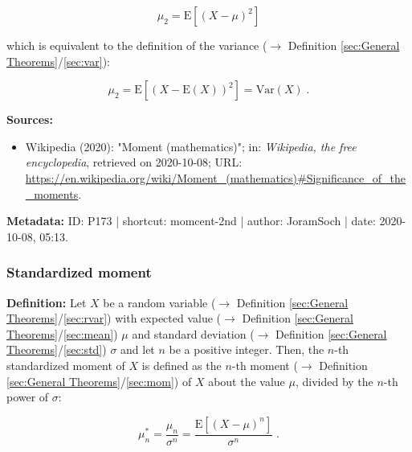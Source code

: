 \documentclass[a4paper,12pt,twoside]{book}
\begin{document}
\begin{equation} \label{eq:momcent-2nd-momcent-2nd-def}
\mu_2 = \mathrm{E}\left[ (X-\mu)^2 \right]
\end{equation}

which is equivalent to the definition of the variance ($\rightarrow$ Definition \ref{sec:General Theorems}/\ref{sec:var}):

\begin{equation} \label{eq:momcent-2nd-momraw-1st-qed}
\mu_2 = \mathrm{E}\left[ (X - \mathrm{E}(X))^2 \right] = \mathrm{Var}(X) \; .
\end{equation}


\vspace{1em}
\textbf{Sources:}
\begin{itemize}
\item Wikipedia (2020): "Moment (mathematics)"; in: \textit{Wikipedia, the free encyclopedia}, retrieved on 2020-10-08; URL: \url{https://en.wikipedia.org/wiki/Moment_(mathematics)#Significance_of_the_moments}.
\end{itemize}


\vspace{1em}
\textbf{Metadata:} ID: P173 | shortcut: momcent-2nd | author: JoramSoch | date: 2020-10-08, 05:13.
\vspace{1em}



\subsubsection[\textit{Standardized moment}]{Standardized moment} \label{sec:mom-stand}
\setcounter{equation}{0}

\textbf{Definition:} Let $X$ be a random variable ($\rightarrow$ Definition \ref{sec:General Theorems}/\ref{sec:rvar}) with expected value ($\rightarrow$ Definition \ref{sec:General Theorems}/\ref{sec:mean}) $\mu$ and standard deviation ($\rightarrow$ Definition \ref{sec:General Theorems}/\ref{sec:std}) $\sigma$ and let $n$ be a positive integer. Then, the $n$-th standardized moment of $X$ is defined as the $n$-th moment ($\rightarrow$ Definition \ref{sec:General Theorems}/\ref{sec:mom}) of $X$ about the value $\mu$, divided by the $n$-th power of $\sigma$:

\begin{equation} \label{eq:mom-stand-mom-stand}
\mu_n^{*} = \frac{\mu_n}{\sigma^n} =  \frac{\mathrm{E}[(X-\mu)^n]}{\sigma^n} \; .
\end{equation}
\end{document}
